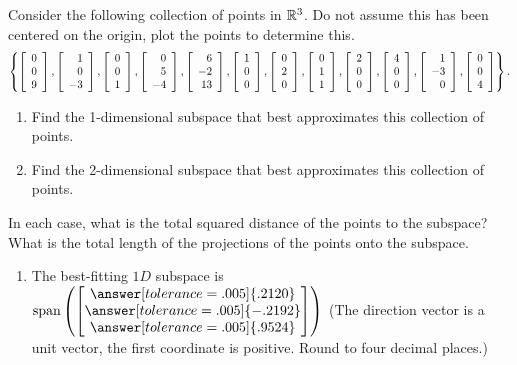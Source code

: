 \documentclass{ximera}
\begin{document}
\begin{problem}
  Consider the following collection of points in $\R^3$. Do not assume this has been centered on the origin, plot the points to determine this.
  \begin{equation*}
    \set{
      \startmat{r} 0 \\ 0 \\ 9 \stopmat,
      \startmat{r} 1 \\ 0 \\ -3 \stopmat,
      \startmat{r} 0 \\ 0 \\ 1 \stopmat,
      \startmat{r} 0 \\ 5 \\ -4 \stopmat,
      \startmat{r} 6 \\ -2 \\ 13 \stopmat,
      \startmat{r} 1 \\ 0 \\ 0 \stopmat,
      \startmat{r} 0 \\ 2 \\ 0 \stopmat,
      \startmat{r} 0 \\ 1 \\ 1 \stopmat,
      \startmat{r} 2 \\ 0 \\ 0 \stopmat,
      \startmat{r} 4 \\ 0 \\ 0 \stopmat,
      \startmat{r} 1 \\ -3 \\ 0 \stopmat,
      \startmat{r} 0 \\ 0 \\ 4 \stopmat
    }.
  \end{equation*}
  \begin{enumerate}
  \item Find the 1-dimensional subspace that best approximates this
    collection of points.
  \item Find the 2-dimensional subspace that best approximates this
    collection of points.
  \end{enumerate}
  In each case, what is the total squared distance of the points to
  the subspace? What is the total length of the projections of the points onto the subspace.

  \begin{solution}
    
    \begin{enumerate}
      \item The best-fitting $1D$ subspace is $\text{span}\left(\begin{bmatrix}
        \answer[tolerance=.005]{.2120}\\\answer[tolerance=.005]{-.2192}\\\answer[tolerance=.005]{.9524}
      \end{bmatrix}\right)$ (The direction vector is a unit vector, the first coordinate is positive. Round to four decimal places.)


\end{enumerate}
\end{solution}
\end{problem}
\end{document}
